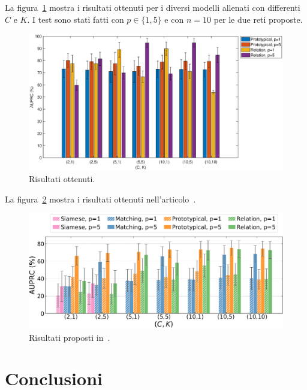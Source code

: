 \documentclass[12pt,a4paper,titlepage]{article}
\begin{document}
La figura~\ref{fig:results} mostra i risultati ottenuti per i diversi modelli allenati con differenti $C$ e $K$. I test sono stati fatti con $p \in \{1, 5\}$ e con $n = 10$ per le due reti proposte. 
\begin{figure}[h]
	\centering	
	\includegraphics[width=1\textwidth]{Immagini/results}
	\caption{Risultati ottenuti.}
	\label{fig:results}
\end{figure}

La figura~\ref{fig:results_paper} mostra i risultati ottenuti nell'articolo~\cite{salamon:Few-Shot}.
\begin{figure}[h]
	\centering	
	\includegraphics[width=1\textwidth]{Immagini/results_paper}
	\caption{Risultati proposti in~\cite{salamon:Few-Shot}.}
	\label{fig:results_paper}
\end{figure}
\clearpage

\section{Conclusioni}
\label{sec:conclusioni}
\clearpage

\nocite{*}
\printbibliography
\end{document}
